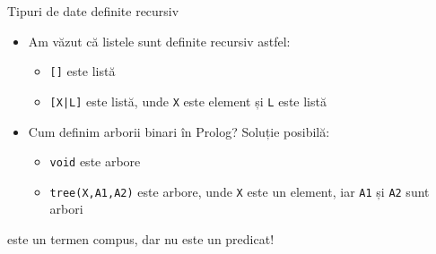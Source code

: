\documentclass[xcolor=x11names,compress,10pt]{beamer}
\begin{document}
\begin{frame}{Tipuri de date definite recursiv}
\begin{itemize}
\item Am văzut că listele sunt definite recursiv astfel:
\medskip

\begin{itemize}
\item \texttt{[]} este listă
\item \texttt{[X|L]} este listă, unde \texttt{X} este element și \texttt{L} este listă
\end{itemize}

\bigskip\pause

\item Cum definim arborii binari în Prolog? \pause Soluție posibilă:\pause
\medskip

\begin{itemize}
\item \texttt{void} este arbore \pause
\item \texttt{tree(X,A1,A2)} este arbore, unde \texttt{X} este un element, iar \texttt{A1} și \texttt{A2} sunt arbori
\end{itemize} 
\end{itemize}
\pause

\begin{center}
 este un termen compus, dar nu este un predicat!
\end{center}
\end{frame}
\end{document}
